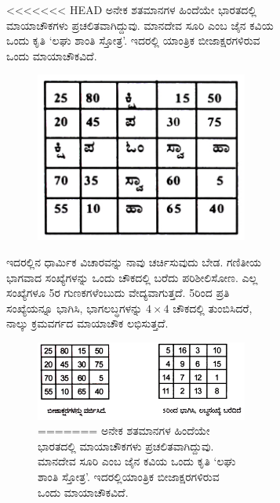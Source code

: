 \begin{figure}[H]
\begin{figure}[H]
<<<<<<< HEAD
ಅನೇಕ ಶತಮಾನಗಳ ಹಿಂದೆಯೇ ಭಾರತದಲ್ಲಿ ಮಾಯಾಚೌಕಗಳು ಪ್ರಚಲಿತವಾಗಿದ್ದುವು. ಮಾನದೇವ ಸೂರಿ ಎಂಬ ಜೈನ ಕವಿಯ ಒಂದು ಕೃತಿ ‘ಲಘು ಶಾಂತಿ ಸ್ತೋತ್ರ’. ಇದರಲ್ಲಿ ಯಾಂತ್ರಿಕ ಬೀಜಾಕ್ಷರಗಳಿರುವ ಒಂದು ಮಾಯಾಚೌಕವಿದೆ.
\begin{figure}[H]
\includegraphics{src/figures/chap4/fig4-8.jpg}
\end{figure}
ಇದರಲ್ಲಿನ ಧಾರ್ಮಿಕ ವಿಚಾರವನ್ನು ನಾವು ಚರ್ಚಿಸುವುದು ಬೇಡ. ಗಣಿತೀಯ ಭಾಗವಾದ ಸಂಖ್ಯೆಗಳನ್ನು ಒಂದು ಚೌಕದಲ್ಲಿ ಬರೆದು ಪರಿಶೀಲಿಸೋಣ. ಎಲ್ಲ ಸಂಖ್ಯೆಗಳೂ 5ರ ಗುಣಕಗಳೆಂಬುದು ವೇದ್ಯವಾಗುತ್ತದೆ. 5ರಿಂದ ಪ್ರತಿ ಸಂಖ್ಯೆಯನ್ನೂ ಭಾಗಿಸಿ, ಭಾಗಲಬ್ಧಗಳನ್ನು $4 \times 4$ ಚೌಕದಲ್ಲಿ ತುಂಬಿಸಿದರೆ, ನಾಲ್ಕು ಕ್ರಮವರ್ಗದ ಮಾಯಾಚೌಕ ಲಭಿಸುತ್ತದೆ.
\begin{figure}[H]
\includegraphics{src/figures/chap4/fig4-9.jpg}
=======
ಅನೇಕ ಶತಮಾನಗಳ ಹಿಂದೆಯೇ ಭಾರತದಲ್ಲಿ ಮಾಯಾಚೌಕಗಳು ಪ್ರಚಲಿತವಾಗಿದ್ದುವು. ಮಾನದೇವ ಸೂರಿ ಎಂಬ ಜೈನ ಕವಿಯ ಒಂದು ಕೃತಿ ‘ಲಘು ಶಾಂತಿ ಸ್ತೋತ್ರ’. ಇದರಲ್ಲಿ\break ಯಾಂತ್ರಿಕ ಬೀಜಾಕ್ಷರಗಳಿರುವ ಒಂದು ಮಾಯಾಚೌಕವಿದೆ.
\begin{figure}[H]

\end{figure}
\end{figure}
\end{figure}
\end{figure}

